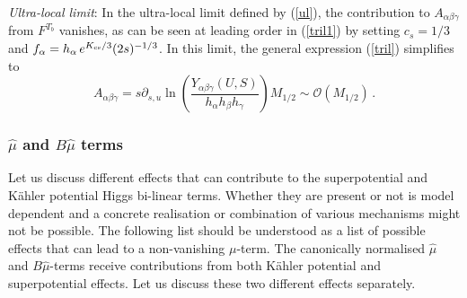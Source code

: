 \documentclass[11pt,a4paper]{article}
\newcommand{\be}{\begin{equation}}
\newcommand{\ee}{\end{equation}}
\newcommand{\mc}{\mathcal}
\begin{document}
\medskip
\emph{Ultra-local limit}: In the ultra-local limit defined by (\ref{ul}), the contribution to $A_{\alpha\beta\gamma}$ from $F^{T_b}$ vanishes,
as can be seen at leading order in (\ref{tril1}) by setting $c_s=1/3$ and $f_{\alpha} = h_\alpha\,e^{K_{\rm cs}/3}(2s)^{-1/3}$.
In this limit, the general expression (\ref{tril}) simplifies to
\be
\label{trilul}
A_{\alpha\beta\gamma} = s \partial_{s,u}
\ln \left(\frac{Y_{\alpha \beta \gamma}(U,S)}{h_\alpha h_\beta h_\gamma}\right) M_{1/2}\sim\mc{O}\left(M_{1/2}\right)\,.
\ee

\subsubsection{$\hat{\mu}$ and $B\hat{\mu}$ terms}
\label{bmusection}

Let us discuss different effects that can contribute to the superpotential and K\"ahler potential Higgs bi-linear terms. Whether they are present or not is model dependent and a concrete realisation or combination of various mechanisms might not be possible. The following list should be understood as a list of possible effects that can lead to a non-vanishing $\mu$-term.
The canonically normalised $\hat{\mu}$ and $B\hat{\mu}$-terms receive contributions from both K\"ahler potential and superpotential effects.
Let us discuss these two different effects separately.\\
\end{document}
